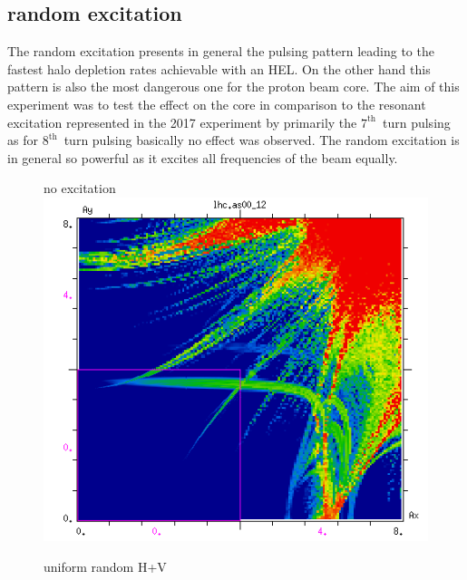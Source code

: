 \documentclass[%
 reprint,
 amsmath,amssymb,
 aps,
prstab,
]{revtex4-1}
\begin{document}
\subsection{random excitation\label{sec:simexran}}
The random excitation presents in general the pulsing pattern leading to the fastest halo depletion rates achievable with an HEL. On the other hand this pattern is also the most dangerous one for the proton beam core. The aim of this experiment was to test the effect on the core in comparison to the resonant excitation represented in the 2017 experiment by primarily the $7^{\mathrm{th}}$~turn pulsing as for $8^{\mathrm{th}}$~turn pulsing basically no effect was observed. The random excitation is in general so powerful as it excites all frequencies of the beam equally.
\begin{figure}[h]
	\begin{minipage}[t]{0.49\linewidth}
		\centering
		no excitation
		\includegraphics[width=1.0\linewidth]{2017injnocolc15o+19_6noerru_dp0_amp.png}
	\end{minipage}
	\begin{minipage}[t]{0.49\linewidth}
		\centering
		uniform random H+V

\end{minipage}
\end{figure}
\end{document}
